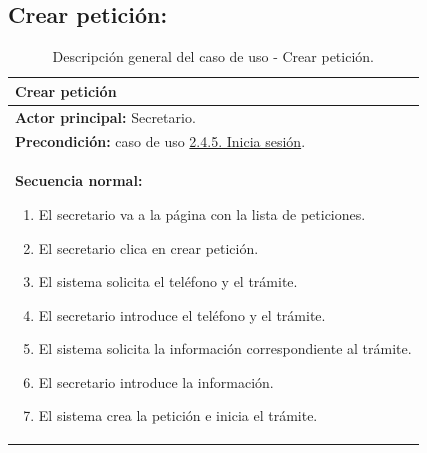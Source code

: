 \documentclass[12pt, a4paper, twoside]{report}
\begin{document}
        \subsection{Crear petición:}
            \begin{table}[H]
            \centering
            \begin{tabular}{|p{16cm}|} 
            \hline
            \textbf{Crear petición} \\ \hline
            \textbf{Actor principal:} Secretario. \\ \hline
            \textbf{Precondición:} caso de uso \hyperref[subsec:2.4.5.]{2.4.5. Inicia sesión}. \\ \hline
            \textbf{Secuencia normal:}
                \begin{enumerate}
                    \item El secretario va a la página con la lista de peticiones.
                    \item El secretario clica en crear petición.
                    \item El sistema solicita el teléfono y el trámite.
                    \item El secretario introduce el teléfono y el trámite.
                    \item El sistema solicita la información correspondiente al trámite.
                    \item El secretario introduce la información.
                    \item El sistema crea la petición e inicia el trámite.
                \end{enumerate} \\ \hline
            \end{tabular}
            \caption{Descripción general del caso de uso - Crear petición.}
            \end{table}
\end{document}
